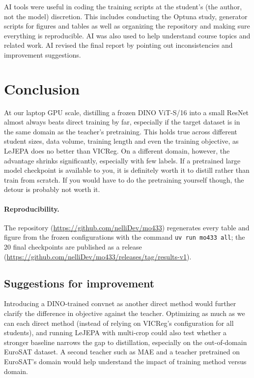\documentclass[letterpaper,11pt]{article}
\begin{document}

AI tools were useful in coding the training scripts at the student's (the author, not the model) discretion. This includes conducting the Optuna study, generator scripts for figures and tables as well as organizing the repository and making sure everything is reproducible. AI was also used to help understand course topics and related work. AI revised the final report by pointing out inconsistencies and improvement suggestions. 
\clearpage
\section{Conclusion}
\label{sec:conclusion}

At our laptop GPU scale, distilling a frozen DINO ViT-S/16 into a small ResNet almost always beats direct training by far, especially if the target dataset is in the same domain as the teacher's pretraining. This holds true across different student sizes, data volume, training length and even the training objective, as LeJEPA does no better than VICReg. On a different domain, however, the advantage shrinks significantly, especially with few labels. If a pretrained large model checkpoint is available to you, it is definitely worth it to distill rather than train from scratch. If you would have to do the pretraining yourself though, the detour is probably not worth it.

\paragraph{Reproducibility.} The repository (\url{https://github.com/nelliDev/mo433})
regenerates every table and figure from the frozen configurations with the command
\texttt{uv run mo433 all}; the 20 final checkpoints are published as a release
(\url{https://github.com/nelliDev/mo433/releases/tag/results-v1}).

\subsection{Suggestions for improvement}
\label{sec:suggestions}

Introducing a DINO-trained convnet as another direct method would further clarify the difference in objective against the teacher. Optimizing as much as we can each direct method (instead of relying on VICReg's configuration for all students), and running LeJEPA with multi-crop could also test whether a stronger baseline narrows the gap to distillation, especially on the out-of-domain EuroSAT dataset. A second teacher such as MAE and a teacher pretrained on EuroSAT's domain would help understand the impact of training method versus domain. 

{\small
\setlength{\bibsep}{2pt}


}
\end{document}
